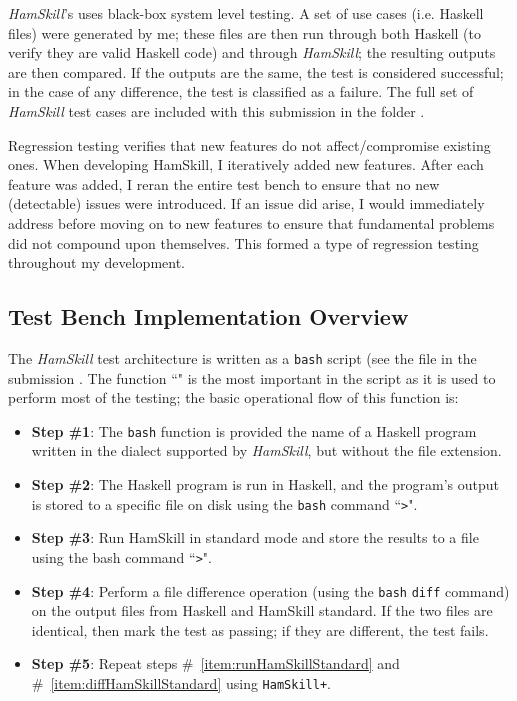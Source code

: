 \documentclass{report}
\begin{document}
\textit{HamSkill}'s uses black-box system level testing.  A set of use cases (i.e. Haskell files) were generated by me; these files are then run through both Haskell (to verify they are valid Haskell code) and through \textit{HamSkill}; the resulting outputs are then compared.  If the outputs are the same, the test is considered successful; in the case of any difference, the test is classified as a failure.  The full set of \textit{HamSkill} test cases are included with this submission in the folder .

Regression testing verifies that new features do not affect/compromise existing ones.  When developing HamSkill, I iteratively added new features.  After each feature was added, I reran the entire test bench to ensure that no new (detectable) issues were introduced.  If an issue did arise, I would immediately address before moving on to new features to ensure that fundamental problems did not compound upon themselves. This formed a type of regression testing throughout my development.

\subsection{Test Bench Implementation Overview}

The \textit{HamSkill} test architecture is written as a \texttt{bash} script (see the file in the submission .  The function ``" is the most important in the script as it is used to perform most of the testing; the basic operational flow of this function is:

\begin{itemize}

\item \textbf{Step \#1}: The \texttt{bash} function is provided the name of a Haskell program written in the dialect supported by \textit{HamSkill}, but without the file extension.

\item \textbf{Step \#2}: The Haskell program is run in Haskell, and the program's output is stored to a specific file on disk using the \texttt{bash} command ``\texttt{>}". 

\item\label{item:runHamSkillStandard} \textbf{Step \#3}: Run HamSkill in standard mode and store the results to a file using the bash command ``\texttt{>}". 

\item\label{item:diffHamSkillStandard} \textbf{Step \#4}: Perform a file difference operation (using the \texttt{bash} \texttt{diff} command) on the output files from Haskell and HamSkill standard.  If the two files are identical, then mark the test as passing; if they are different, the test fails.
 
\item \textbf{Step \#5}: Repeat steps \#~\ref{item:runHamSkillStandard} and \#~\ref{item:diffHamSkillStandard} using \texttt{HamSkill+}.

\end{itemize}
\end{document}

